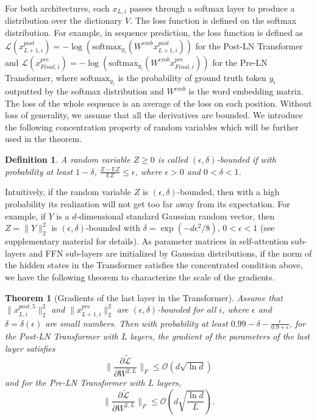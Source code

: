 \documentclass{article}
\newtheorem{theorem}{Theorem}
\newtheorem{definition}{Definition}
\begin{document}
For both architectures, each $x_{L,i}$  passes through a softmax layer to produce a distribution over the dictionary $V$. The loss function is defined on the softmax distribution. For example, in sequence prediction, the loss function is defined as $\mathcal{L}(x_{L+1,i}^{post})=-\log(\text{softmax}_{y_i}(W^{emb}x_{L+1,i}^{post}))$ for the Post-LN Transformer and $\mathcal{L}(x_{Final,i}^{pre})=-\log(\text{softmax}_{y_i}(W^{emb}x_{Final,i}^{pre}))$ for the Pre-LN Transformer, where $\text{softmax}_{y_i}$ is the probability of ground truth token $y_i$ outputted by the softmax distribution and $W^{emb}$ is the word embedding matrix. The loss of the whole sequence is an average of the loss on each position. Without loss of generality, we assume that all the derivatives are bounded. We introduce the following concentration property of random variables which will be further used in the theorem.

\begin{definition}
A random variable $Z\geq 0$ is called $(\epsilon,\delta)$-bounded if with probability at least $1-\delta$, $\frac{Z-\mathbb{E}Z}{\mathbb{E}Z}\leq \epsilon$, where $\epsilon>0$ and $0<\delta<1$. %
\end{definition}

Intuitively, if the random variable $Z$ is $(\epsilon,\delta)$-bounded, then with a high probability its realization will not get too far away from its expectation. For example, if $Y$ is a $d$-dimensional standard Gaussian random vector, then $Z=\|Y\|_2^2$ is $(\epsilon,\delta)$-bounded with $\delta=\exp(-d\epsilon^2/8)$, $0<\epsilon<1$ (see 
 supplementary material for details). As parameter matrices in self-attention sub-layers and FFN sub-layers are initialized by Gaussian distributions, if the norm of the hidden states in the Transformer satisfies the concentrated condition above, we have the following theorem to characterize the scale of the gradients.

\begin{theorem} [Gradients of the last layer in the Transformer]
Assume that $\|x^{post,5}_{L,i}\|_2^2$ and $\|x^{pre}_{L+1,i}\|_2^2$ are $(\epsilon,\delta)$-bounded for all $i$, where $\epsilon$ and $\delta=\delta(\epsilon)$ are small numbers.  Then with probability at least $0.99-\delta-\frac{\epsilon}{0.9+\epsilon}$, for the Post-LN Transformer with $L$ layers, the gradient of the parameters of the last layer satisfies $$\|\frac{\partial \tilde{\mathcal{L}}}{\partial W^{2,L}}\|_F\leq \mathcal{O}(d\sqrt{\ln{d}})$$ and for the Pre-LN Transformer with $L$ layers, $$\|\frac{\partial \tilde{\mathcal{L}}}{\partial W^{2,L}}\|_F\leq \mathcal{O}\left(d\sqrt{\frac{\ln{d}}{L}}\right).$$
\end{theorem}
\end{document}
